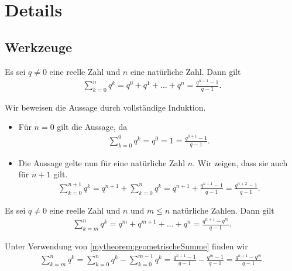 \chapter{Details}\label{ch:Details}

\section{Werkzeuge}
\begin{mytheorem}\label{mytheorem:geometrischeSumme}
	Es sei $q \neq 0$ eine reelle Zahl und $n$ eine natürliche Zahl. Dann gilt
	\begin{align*}
		\sum_{k = 0}^n q^k = q^0 + q^1 + \ldots + q^n = \frac{q^{n+1}-1}{q-1}.
	\end{align*}
	\begin{myproof}
		Wir beweisen die Aussage durch vollständige Induktion.
		\begin{itemize}
			\item Für $n = 0$ gilt die Aussage, da
			      \begin{align*}
				      \sum_{k = 0}^0 q^k = q^0 = 1 = \frac{q^{0+1}-1}{q-1}.
			      \end{align*}
			\item Die Aussage gelte nun für eine natürliche Zahl $n$. Wir zeigen, dass sie auch für $n+1$ gilt.
			      \begin{align*}
				      \sum_{k = 0}^{n+1} q^k = q^{n+1} + \sum_{k = 0}^n q^k = q^{n+1} + \frac{q^{n+1}-1}{q-1} = \frac{q^{n+2}-1}{q-1}.
			      \end{align*}
		\end{itemize}
	\end{myproof}
\end{mytheorem}


\begin{mytheorem}\label{mytheorem:verallgemeinertegeometrischeSumme}
	Es sei $q \neq 0$ eine reelle Zahl und $n$ und $m\leq n$ natürliche Zahlen. Dann gilt
	\begin{align*}
		\sum_{k = m}^n q^k = q^m + q^{m+1} + \ldots + q^n = \frac{q^{n+1}-q^m}{q-1}.
	\end{align*}
	\begin{myproof}
		Unter Verwendung von \cref{mytheorem:geometrischeSumme} finden wir
		\begin{align*}
			\sum_{k = m}^n q^k =
			\sum_{k = 0}^n q^k - \sum_{k = 0}^{m-1} q^k =
			\frac{q^{n+1}-1}{q-1} - \frac{q^m - 1}{q-1} =
			\frac{q^{n+1}-q^m}{q-1}.
		\end{align*}
	\end{myproof}
\end{mytheorem}

